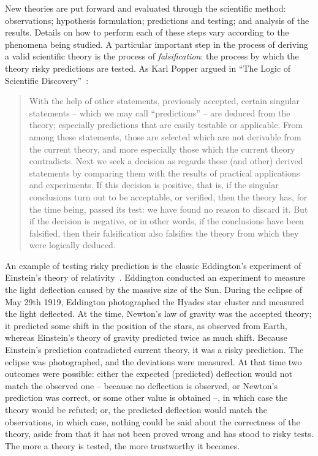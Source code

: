 New theories are put forward and evaluated through the scientific method: observations; hypothesis formulation; predictions and testing; and analysis of the results. Details on how to perform each of these steps vary according to the phenomena being studied. A particular important step in the process of deriving a valid scientific theory is the process of \emph{falsification}: the process by which the theory risky predictions are tested. As Karl Popper argued in ``The Logic of Scientific Discovery''~\cite{popper-scientificdiscovery}:
 \begin{quote}
With the help of other statements, previously accepted, certain singular statements  --  which we may call ``predictions'' -- are deduced from the theory; especially predictions that are easily testable or applicable. From among these statements, those are selected which are not derivable from the current theory, and more especially those which the current theory contradicts. Next we seek a decision as regards these (and other) derived statements by comparing them with the results of practical applications and experiments. If this decision is positive, that is, if the singular conclusions turn out to be acceptable, or verified, then the theory has, for the time being, passed its test: we have found no reason to discard it. But if the decision is negative, or in other words, if the conclusions have been falsified, then their falsification also falsifies the theory from which they were logically deduced.
 \end{quote}
% 
An example of testing risky prediction is the classic Eddington's experiment of Einstein's theory of relativity~\cite{coles2001einstein}. Eddington conducted an experiment to measure the light deflection caused by the massive size of the Sun.  During the eclipse of May 29th 1919, Eddington photographed the Hyades star cluster and measured the light deflected. At the time, Newton's law of gravity was the accepted theory; it predicted some shift in the position of the stars, as observed from Earth, whereas Einstein's theory of gravity predicted twice as much shift. Because Einstein's prediction contradicted current theory, it was a risky prediction.
%
The eclipse was photographed, and the deviations were measured.  At that time two outcomes were possible: either the expected (predicted) deflection would not match the observed one -- because no deflection is observed, or Newton's prediction was correct, or some other value is obtained --,  in which case the theory would be refuted; or, the predicted deflection would match the observations, in which case, nothing could be said about the correctness of the theory, aside from that it has not been proved wrong and has stood to risky tests. The more a theory is tested, the more trustworthy it becomes. 

